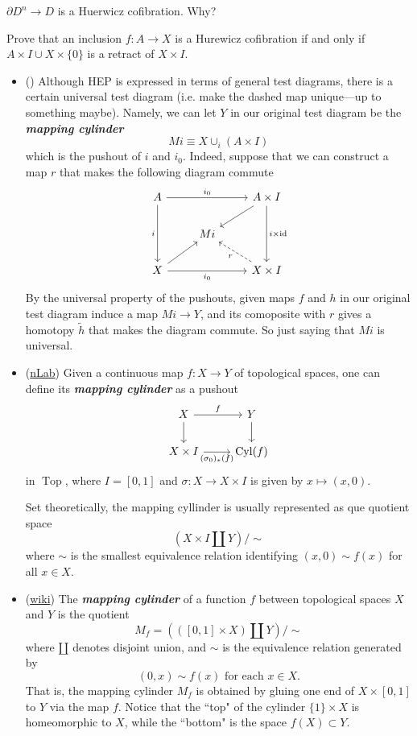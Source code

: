 \documentclass{article}
\DeclareMathOperator{\id}{id}
\DeclareMathOperator{\Top}{Top}
\DeclareMathOperator{\Cyl}{Cyl}
\begin{document}
\begin{example}
$\partial D^n\to D$ is a Huerwicz cofibration. {\color{orange} Why?}
\end{example}
\begin{exercise}
	Prove that an inclusion $f : A \to X$ is a Hurewicz cofibration if and only if $A \times I \cup X \times \{0\}$ is a retract of $X \times I$.
\end{exercise}
\begin{defn}\leavevmode
	\begin{itemize}
		\item (\cite{may}) Although HEP is expressed in terms of general test diagrams, there is a certain universal test diagram {\color{cyan}(i.e. make the dashed map unique---up to something maybe)}. Namely, we can let $Y$ in our original test diagram be the \textbf{\textit{mapping cylinder}}
	\[Mi\equiv X\cup_i(A\times I)\]
	which is the pushout of $i$ and $i_0$. Indeed, suppose that we can construct a map $r$ that makes the following diagram commute
	\[\begin{tikzcd}
		A\arrow[rr,"i_0"]\arrow[dd,"i",swap]&&A\times I\arrow[dd,"i\times\id"]\arrow[dl]\\
		&Mi\\
		X\arrow[ur]\arrow[rr,"i_0",swap]&&X\times I\arrow[ul,dashed,"r"]
	\end{tikzcd}\]
	By the universal property of the pushouts, given maps $f$ and $h$ in our original test diagram induce a map $Mi\to Y$, and its comoposite with $r$ gives a homotopy $\tilde{h}$ that makes the diagram commute. {\color{cyan}So just saying that $Mi$ is universal.}
	\item (\href{https://ncatlab.org/nlab/show/mapping+cylinder}{nLab}) Given a continuous map $f:X\to Y$ of topological spaces, one can define its \textbf{\textit{mapping cylinder}} as a pushout
	\[\begin{tikzcd}
		X\arrow[r,"f"]\arrow[d]&Y\arrow[d]\\
		X\times I\arrow[r,swap,"(\sigma_0)_*(f)"]&\Cyl(f)
	\end{tikzcd}\]
	in $\Top$, where $I=[0,1]$ and $\sigma:X\to X\times I$ is given by $x\mapsto(x,0)$.
	
	Set theoretically, the mapping cyllinder is usually represented as que quotient space
	\[\left(X\times I\coprod Y\right)\Big/\sim\]
	where $\sim$ is the smallest equivalence relation identifying $(x,0)\sim f(x)$ for all $x\in X$.
	
	\item (\href{https://en.wikipedia.org/wiki/Mapping_cylinder}{wiki}) The \textbf{\textit{mapping cylinder}} of a function $f$ between topological spaces $X$ and $Y$ is the quotient
	\[M_f=(([0,1]\times X)\amalg Y)\big/\sim\]
	where $\amalg$ denotes disjoint union, and $\sim$ is the equivalence relation generated by
	\[(0,x)\sim f(x)\text{ for each }x\in X.\]
	{\color{persiangreen}That is, the mapping cylinder $M_f$ is obtained by gluing one end of $X\times[0,1]$ to $Y$ via the map $f$.} Notice that the ``top" of the cylinder $\{1\}\times X$ is homeomorphic to $X$, while the ``bottom" is the space $f(X)\subset Y$.
	

\end{itemize}
\end{defn}
\end{document}

